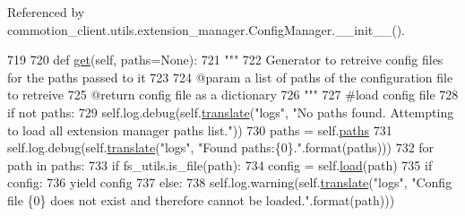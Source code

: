 Referenced by commotion\+\_\+client.\+utils.\+extension\+\_\+manager.\+Config\+Manager.\+\_\+\+\_\+init\+\_\+\+\_\+().


\begin{DoxyCode}
719 
720     \textcolor{keyword}{def }\hyperlink{classcommotion__client_1_1utils_1_1extension__manager_1_1ConfigManager_aa5d4504ee2b1a228e0543e0bd4313b88}{get}(self, paths=None):
721         \textcolor{stringliteral}{"""}
722 \textcolor{stringliteral}{        Generator to retreive config files for the paths passed to it}
723 \textcolor{stringliteral}{}
724 \textcolor{stringliteral}{        @param a list of paths of the configuration file to retreive}
725 \textcolor{stringliteral}{        @return config file as a dictionary}
726 \textcolor{stringliteral}{        """}
727         \textcolor{comment}{#load config file}
728         \textcolor{keywordflow}{if} \textcolor{keywordflow}{not} paths:
729             self.log.debug(self.\hyperlink{classcommotion__client_1_1utils_1_1extension__manager_1_1ConfigManager_aa0ce09aefdd36656f0a1abfad14e9ff1}{translate}(\textcolor{stringliteral}{"logs"}, \textcolor{stringliteral}{"No paths found. Attempting to load all
       extension manager paths list."}))
730             paths = self.\hyperlink{classcommotion__client_1_1utils_1_1extension__manager_1_1ConfigManager_a0e2fabb5da2d9be8b5c12aed0e8f3661}{paths}
731             self.log.debug(self.\hyperlink{classcommotion__client_1_1utils_1_1extension__manager_1_1ConfigManager_aa0ce09aefdd36656f0a1abfad14e9ff1}{translate}(\textcolor{stringliteral}{"logs"}, \textcolor{stringliteral}{"Found paths:\{0\}."}.format(paths)))
732         \textcolor{keywordflow}{for} path \textcolor{keywordflow}{in} paths:
733             \textcolor{keywordflow}{if} fs\_utils.is\_file(path):
734                 config = self.\hyperlink{classcommotion__client_1_1utils_1_1extension__manager_1_1ConfigManager_a3da851319b205bf97e350946b4408ff8}{load}(path)
735                 \textcolor{keywordflow}{if} config:
736                     \textcolor{keywordflow}{yield} config
737             \textcolor{keywordflow}{else}:
738                 self.log.warning(self.\hyperlink{classcommotion__client_1_1utils_1_1extension__manager_1_1ConfigManager_aa0ce09aefdd36656f0a1abfad14e9ff1}{translate}(\textcolor{stringliteral}{"logs"}, \textcolor{stringliteral}{"Config file \{0\} does not exist and
       therefore cannot be loaded."}.format(path)))

\end{DoxyCode}
